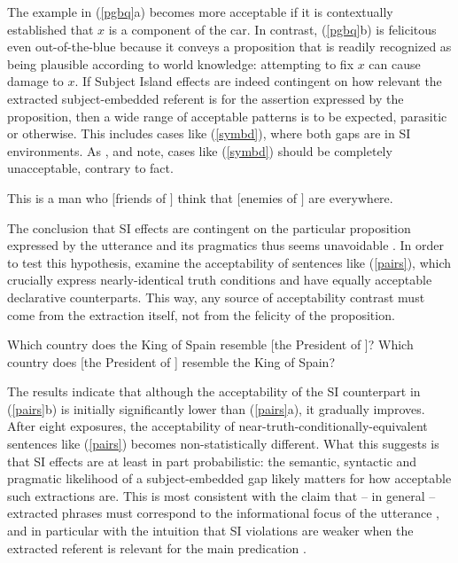 \documentclass[output=paper
 	        ,biblatex
                ,babelshorthands
                ,newtxmath
                ,draftmode
                ,colorlinks, citecolor=brown
]{langscibook}
\begin{document}
\noindent
The example in (\ref{pgbq}a) becomes more acceptable if it is contextually established that $x$ is a
component of the car. In contrast, (\ref{pgbq}b) is felicitous even out-of-the-blue because it
conveys a proposition that is readily recognized as being plausible according to world knowledge:
attempting to fix $x$ can cause damage to $x$.  If Subject Island effects are indeed contingent on
how relevant the extracted subject-embedded referent is for the assertion expressed by the
proposition, then a wide range of acceptable patterns is to be expected, parasitic or
otherwise. This includes cases like (\ref{symbd}), where both gaps are in SI environments. As
\citet{Levine:Sag:03}, \citet[256]{levhubook} and \citet[161]{Culicover13} note, cases like
(\ref{symbd}) should be completely unacceptable, contrary to fact.


\eanoraggedright 
\label{symbd}
This is a man who $[$friends of \spcs $]$ think that $[$enemies of \spcs $]$ are everywhere.
\z 

The conclusion that SI effects are contingent on the particular proposition expressed by the
utterance and its pragmatics thus seems unavoidable \citep{chavesresp}. In order to test this
hypothesis, \citet{chavesresp} examine the acceptability of sentences like (\ref{pairs}), which
crucially express nearly-identical truth conditions and have equally acceptable declarative
counterparts. This way, any source of acceptability contrast must come from the extraction itself,
not from the felicity of the proposition.

\eal  \label{pairs}
\ex Which country does the King of  Spain resemble [the President of \spcs]?
\ex Which country does [the President of \spcs] resemble  the King of Spain?
\zl

\noindent
The results indicate that although the acceptability of the SI counterpart in (\ref{pairs}b) is
initially significantly lower than (\ref{pairs}a), it gradually improves.  After eight exposures,
the acceptability of near-truth-conditionally-equivalent sentences like (\ref{pairs}) becomes
non-statistically different.  What this suggests is that SI effects are at least in part
probabilistic: the semantic, syntactic and pragmatic likelihood of a subject-embedded gap likely
matters for how acceptable such extractions are. This is most consistent with the claim that -- in
general -- extracted phrases must correspond to the informational focus of the utterance
\citep{shir-jrn,valin86,kuno87,ken,Dean,goldberg13}, and in particular with the intuition that SI
violations are weaker when the extracted referent is relevant for the main predication
\citep[495]{kluender06}.
\end{document}
